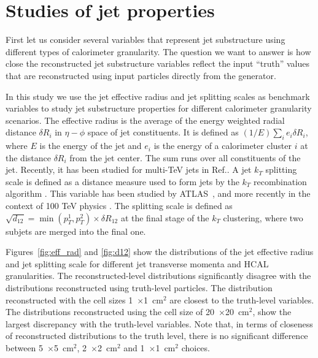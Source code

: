 \section{Studies of jet properties}
\label{sec:jets}

First let us consider several variables that represent jet substructure using different types
of calorimeter granularity. The question we want to answer is how close the reconstructed
jet substructure variables reflect the input ``truth'' values  that are reconstructed using 
input particles directly from the \pythia generator.

In this study we use the jet effective radius and jet splitting scales as benchmark variables
to study jet substructure properties for different calorimeter granularity scenarios. 
The effective radius is the average of the energy weighted radial distance $\delta R_i$ in $\eta-\phi$ space of jet constituents.
It is defined as $(1/E) \sum_i e_i \delta R_i$, where $E$ is the energy of the jet and $e_i$ is the energy of a calorimeter 
cluster $i$ at the distance $\delta R_i$ from the jet center. The sum runs over all constituents of the jet. 
Recently, it has been studied for multi-TeV jets in Ref.\cite{Auerbach:2014xua}.
A jet $k_T$ splitting scale \cite{Butterworth:2002tt} is defined as a distance measure
used to form jets by the $k_T$ recombination
algorithm \cite{Catani1993187,Ellis:1993tq}.
This variable has been studied by ATLAS~\cite{ATLAS:2012am}, and more recently in the context of 100 TeV physics \cite{Auerbach:2014xua}.
The splitting scale is defined as 
$\sqrt{d_{12}}=\min(p_T^1,p_T^2) \times \delta R_{12}$ \cite{ATLAS:2012am} at the final stage of the $k_T$ clustering, where two subjets are merged into the final one.

Figures~\ref{fig:eff_rad} and  \ref{fig:d12} show the distributions of 
the jet effective radius and jet splitting scale for  different jet transverse momenta and HCAL granularities. 
The reconstructed-level distributions significantly disagree with the distributions  
reconstructed using truth-level particles. The distribution reconstructed with the cell
sizes 1~$\times$1~cm$^2$ are closest to the truth-level variables. The distributions 
reconstructed using the cell size of 20~$\times$20~cm$^2$, 
show the largest discrepancy with the
truth-level variables. Note that, in terms of closeness of reconstructed distributions to the truth level, 
there is no significant difference between 5~$\times$5~cm$^2$,  2~$\times$2~cm$^2$ and  1~$\times$1~cm$^2$ choices. 

